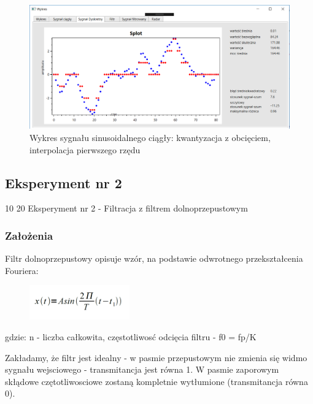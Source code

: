 \documentclass[12pt]{article}
\begin{document}
\newpage
\begin{figure}[h!]
 \centering
 \includegraphics[width=12.3cm]{splotD.PNG}
 \vspace{-0.3cm}
 \caption{Wykres sygnału sinusoidalnego ciągły: kwantyzacja z obcięciem, interpolacja pierwszego rzędu}
 \label{Wykres dla wynikw eksperymentu pierwszego}
\end{figure}


\subsection{Eksperyment nr 2}
10 20
Eksperyment nr 2  - Filtracja z filtrem dolnoprzepustowym
\subsubsection{Założenia}
Filtr dolnoprzepustowy opisuje wzór, na podstawie odwrotnego przekształcenia Fouriera:

\begin{figure}[h!]
 \centering
 \includegraphics[width=4.3cm]{SinWzor.PNG}
 \vspace{-0.3cm}
 \label{gw}
\end{figure}

gdzie:
\subitem n - liczba całkowita,
\subitem częstotliwosć odcięcia filtru - f0 =  fp/K

Zakładamy, że filtr jest idealny -  w pasmie przepustowym nie zmienia się widmo sygnału wejsciowego -  transmitancja jest równa  1. W pasmie zaporowym skłądowe czętotliwosciowe zostaną kompletnie wytłumione (transmitancja równa 0).
\end{document}
